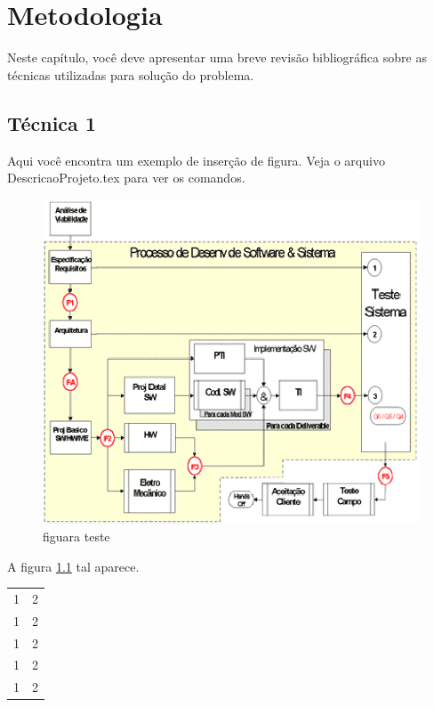 \chapter{Metodologia}

Neste capítulo, você deve apresentar uma breve revisão bibliográfica sobre as técnicas utilizadas para solução do problema.


\section{Técnica 1}
\label{metodo}

Aqui você encontra um exemplo de inserção de figura. Veja o arquivo DescricaoProjeto.tex para ver os comandos.
\begin{figure}[!htbp]
	\centering		
	\includegraphics[bb =0 0 264  221]{Resultados/ciclodesenvolvimento.eps}
	\caption{figuara teste}
	\label{fig:ciclodesenvolvimento}
\end{figure}

A figura \ref{fig:ciclodesenvolvimento} tal aparece.

\begin{table}
	\centering
		\begin{tabular}{c|c}
			1 & 2 \\
			1 & 2 \\
			1 & 2 \\
			1 & 2 \\
			1 & 2 \\			
		\end{tabular}
\end{table}


